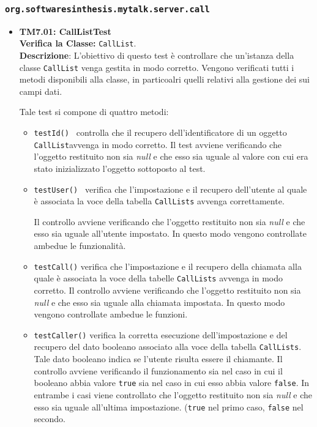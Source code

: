 \subsubsection{\texttt{org.softwaresinthesis.mytalk.server.call}}
\begin{itemize}
\item \textbf{TM7.01: CallListTest}\\
\textbf{Verifica la Classe:} \texttt{CallList}.\\
\textbf{Descrizione}: L'obiettivo di questo test è controllare che un'istanza della classe \texttt{CallList} venga gestita in modo corretto. Vengono verificati tutti i metodi disponibili alla classe, in particoalri quelli relativi alla gestione dei sui campi dati.

Tale test si compone di quattro metodi:
\begin{itemize}
\item \texttt{testId() } controlla che il recupero dell'identificatore di un oggetto \texttt{CallList}avvenga in modo corretto. 
Il test avviene verificando che l'oggetto restituito non sia \textit{null} e che esso sia uguale al valore con cui era stato inizializzato l'oggetto sottoposto al test.

\item \texttt{testUser() } verifica che l'impostazione e il recupero dell'utente al quale è associata la voce della tabella \texttt{CallLists} avvenga correttamente. 

Il controllo avviene verificando che l'oggetto restituito non sia \textit{null} e che esso sia uguale all'utente impostato. In questo modo vengono controllate ambedue le funzionalità.

\item \texttt{testCall()} verifica che l'impostazione e il recupero della chiamata alla quale è associata la voce della tabelle \texttt{CallLists} avvenga in modo corretto. Il controllo avviene verificando che l'oggetto restituito non sia \textit{null} e che esso sia uguale alla chiamata impostata. In questo modo vengono controllate ambedue le funzioni.

\item \texttt{testCaller()} verifica la corretta esecuzione  dell'impostazione e del recupero del dato booleano associato alla voce della tabella \texttt{CallLists}. Tale dato booleano indica se l'utente risulta essere il chiamante.
Il controllo avviene verificando il funzionamento sia nel caso in cui il booleano abbia valore \texttt{true} sia nel caso in cui esso abbia valore \texttt{false}.
In entrambe i casi viene controllato che l'oggetto restituito non sia \textit{null} e che esso sia uguale all'ultima impostazione. (\texttt{true} nel primo caso, \texttt{false} nel secondo.


\end{itemize}
\end{itemize}
